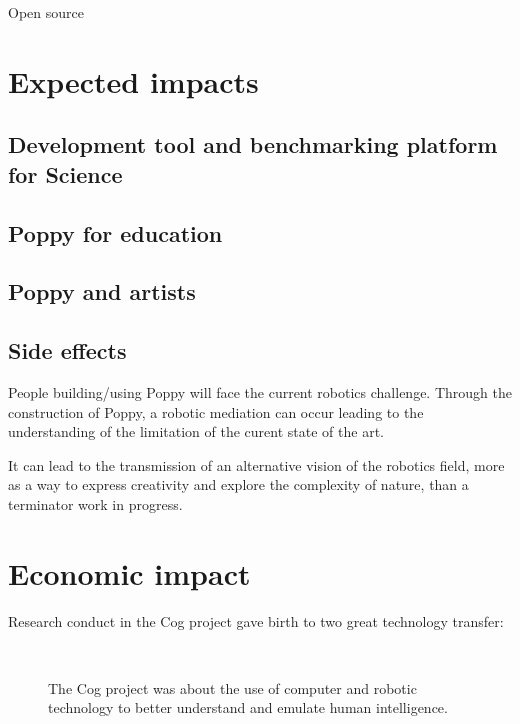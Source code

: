 Open source


\section{Expected impacts} %

\subsection{Development tool and benchmarking platform for Science} %

\subsection{Poppy for education} %

\subsection{Poppy and artists} %


\subsection{Side effects} %
People building/using Poppy will face the current robotics challenge. Through the construction of Poppy, a robotic mediation can occur leading to the understanding of the limitation of the curent state of the art.

It can lead to the transmission of an alternative vision of the robotics field, more as a way to express creativity and explore the complexity of nature, than a terminator work in progress.




\section{Economic impact} %

Research conduct in the Cog project gave birth to two great technology transfer:

\begin{figure}[t]
\centering
    \hfil
     \\
    \hfil
    \caption{The Cog project was about the use of computer and robotic technology to better understand and emulate human intelligence.}
    \label{}
\end{figure}



